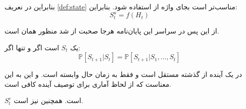 بنابراین در نعریف \ref{def:state} مناسب‌تر است بجای واژه  از  استفاده شود. بنابراین:
	\[
	S_t^a = f(H_t)
	\]
	
\begin{note}
	از این پس در سراسر این پایان‌نامه هرجا صحبت از  شد منظور همان  است.
\end{note}
	
\begin{definition}
	یک 
	$S_t$
	است اگر و تنها اگر:
	$$
		\mathbb{P}\left[S_{t+1} | S_{t}\right]=\mathbb{P}\left[S_{t+1} | S_{1}, \ldots, S_{t}\right]
	$$
\end{definition}
در یک  آینده از گذشته مستقل است و فقط به زمان حال وابسته است.
و این به این معناست که  از لحاظ آماری برای توصیف آینده کافی است.

\begin{remark}
	 $S_t^e$   است.
	همچنین 
	 نیز  است.
\end{remark}


\subsection{}























